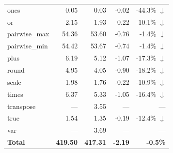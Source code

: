\begin{table}[H]
\begin{tabular}{l r r r r}
  ones & 0.05 & 0.03 & -0.02 & -44.3\% $\downarrow$ \\
  or & 2.15 & 1.93 & -0.22 & -10.1\% $\downarrow$ \\
  pairwise\_max & 54.36 & 53.60 & -0.76 & -1.4\% $\downarrow$ \\
  pairwise\_min & 54.42 & 53.67 & -0.74 & -1.4\% $\downarrow$ \\
  plus & 6.19 & 5.12 & -1.07 & -17.3\% $\downarrow$ \\
  round & 4.95 & 4.05 & -0.90 & -18.2\% $\downarrow$ \\
  scale & 1.98 & 1.76 & -0.22 & -10.9\% $\downarrow$ \\
  times & 6.37 & 5.33 & -1.05 & -16.4\% $\downarrow$ \\
  transpose & --- & 3.55 & --- & ---  \\
  true & 1.54 & 1.35 & -0.19 & -12.4\% $\downarrow$ \\
  var & --- & 3.69 & --- & ---  \\
\midrule
  \textbf{Total} & \textbf{419.50} & \textbf{417.31} & \textbf{-2.19} & \textbf{-0.5\%} \\
\bottomrule
\end{tabular}
\end{table}
